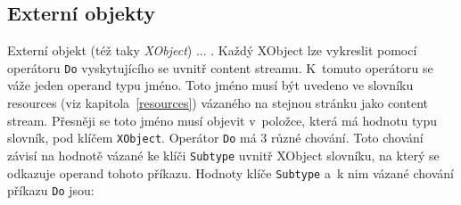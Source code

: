 \subsection*{Externí objekty}
Externí objekt (též taky \emph{XObject}) ... .
Každý XObject lze vykreslit pomocí operátoru \texttt{Do} vyskytujícího se uvnitř
content streamu. K~tomuto operátoru se váže jeden operand typu jméno. Toto jméno
musí být uvedeno ve slovníku resources (viz kapitola~\ref{resources}) vázaného
na stejnou stránku jako content stream. Přesněji se toto jméno musí objevit
v~položce, která má hodnotu typu slovník, pod klíčem \texttt{XObject}. Operátor
\texttt{Do} má 3 různé chování. Toto chování závisí na hodnotě vázané ke klíči
\texttt{Subtype} uvnitř XObject slovníku, na který se odkazuje operand tohoto
příkazu. Hodnoty klíče \texttt{Subtype} a~k nim vázané chování příkazu
\texttt{Do} jsou:

